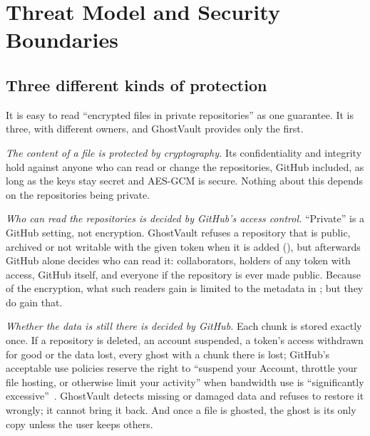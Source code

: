 \section{Threat Model and Security Boundaries}\label{sec:threats}

\subsection{Three different kinds of protection}
It is easy to read ``encrypted files in private repositories'' as one guarantee. It is three, with
different owners, and GhostVault provides only the first.

\emph{The content of a file is protected by cryptography.} Its confidentiality and integrity hold
against anyone who can read or change the repositories, GitHub included, as long as the keys stay
secret and AES-GCM is secure. Nothing about this depends on the repositories being private.

\emph{Who can read the repositories is decided by GitHub's access control.} ``Private'' is a
GitHub setting, not encryption. GhostVault refuses a repository that is public, archived or not
writable with the given token when it is added (), but afterwards GitHub
alone decides who can read it: collaborators, holders of any token with access, GitHub itself,
and everyone if the repository is ever made public. Because of the encryption, what such readers
gain is limited to the metadata in ; but they do gain that.

\emph{Whether the data is still there is decided by GitHub.} Each chunk is stored exactly once.
If a repository is deleted, an account suspended, a token's access withdrawn for good or the data
lost, every ghost with a chunk there is lost; GitHub's acceptable use policies reserve the right
to ``suspend your Account, throttle your file hosting, or otherwise limit your activity'' when
bandwidth use is ``significantly excessive''~\cite{gh-aup}. GhostVault detects missing or damaged
data and refuses to restore it wrongly; it cannot bring it back. And once a file is ghosted, the
ghost is its only copy unless the user keeps others.

